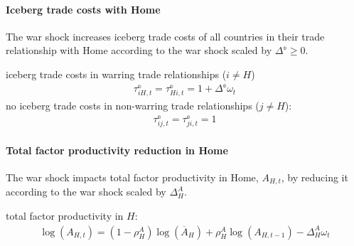 \paragraph{Iceberg trade costs with Home}
The war shock increases iceberg trade costs of all countries
  in their trade relationship with Home
  according to the war shock scaled by \(\Delta^{\mathbb{o}}\geq0\).
\begin{tcolorbox}[colback=lightGray, boxrule=1pt, center title, title=\textbf{Iceberg Trade Costs}]
iceberg trade costs in warring trade relationships (\(i\neq H\))
\begin{align*}
\tau^{\mathbb{o}}_{iH,t} = \tau^{\mathbb{o}}_{Hi,t} = 1 + \Delta^{\mathbb{o}} \omega_{t}
\end{align*}
no iceberg trade costs in non-warring trade relationships (\(j \neq H\)):
\begin{align*}
\tau^{\mathbb{o}}_{ij,t} = \tau^{\mathbb{o}}_{ji,t} = 1
\end{align*}
\end{tcolorbox}

\paragraph{Total factor productivity reduction in Home}
The war shock impacts total factor productivity in Home, \(A_{H,t}\), by reducing it according to the war shock scaled by \(\Delta^{A}_{H}\).
\begin{tcolorbox}[colback=lightGray, boxrule=1pt, center title, title=\textbf{Total Factor Productivity Reduction}]
total factor productivity in \(H\):
\begin{align*}
\log(A_{H,t}) = (1-\rho^{A}_{H}) \log(\overline{A}_{H}) + \rho^{A}_{H} \log(A_{H,t-1}) - \Delta^{A}_{H} \omega_{t}
\end{align*}
\end{tcolorbox}

